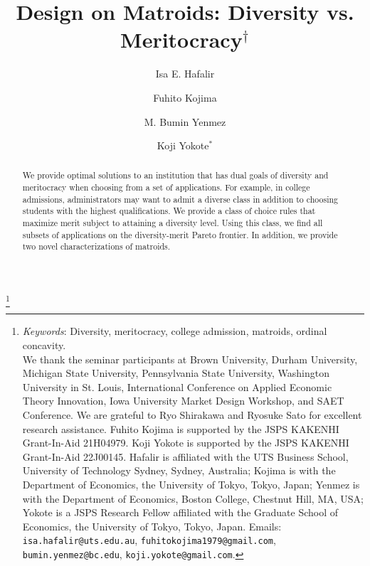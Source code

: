 \documentclass[12pt]{amsart}
\theoremstyle{remark}
\begin{document}
\title[Design on Matroids]{Design on Matroids: Diversity vs. Meritocracy$^{\dagger}$}



\author[Hafalir, Kojima, Yenmez, and Yokote] {Isa E. Hafalir \and Fuhito Kojima  \and M. Bumin Yenmez \and Koji Yokote$^{*}$}



\thanks{\emph{Keywords}: Diversity, meritocracy, college admission, matroids, ordinal concavity.\\
We thank the seminar participants at Brown University, Durham University, Michigan State University, Pennsylvania State University,
Washington University in St. Louis, International Conference on Applied Economic Theory Innovation, Iowa University Market Design Workshop, and SAET Conference.
We are grateful to Ryo Shirakawa and Ryosuke Sato for excellent research assistance. 
Fuhito Kojima is supported by the JSPS KAKENHI Grant-In-Aid 21H04979.
Koji Yokote is supported by the JSPS KAKENHI Grant-In-Aid 22J00145.
Hafalir is affiliated with the UTS Business School, University of Technology Sydney, Sydney, Australia; Kojima is with the Department of Economics, the University of Tokyo, Tokyo, Japan;   Yenmez is with the Department of Economics, Boston College, Chestnut Hill, MA, USA;
Yokote is a JSPS Research Fellow affiliated with the Graduate School of Economics, the University of Tokyo, Tokyo, Japan.
Emails: \texttt{isa.hafalir@uts.edu.au}, \texttt{fuhitokojima1979@gmail.com},
\texttt{bumin.yenmez@bc.edu}, \texttt{koji.yokote@gmail.com}.}





\begin{abstract}
We provide optimal solutions to an institution that has dual goals of diversity
and meritocracy when choosing from a set of applications. For example, in college
admissions, administrators may want to admit a diverse class
in addition to choosing students with the highest qualifications. We provide a class of
choice rules that maximize merit subject to attaining a diversity level.
Using this class, we find all subsets of applications on the
diversity-merit Pareto frontier. In addition, we provide two novel
characterizations of matroids.
\end{abstract}


\end{document}
